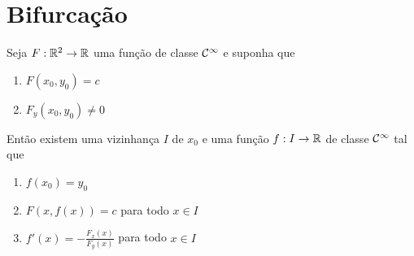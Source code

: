 \section{Bifurcação}

\begin{theorem}
Seja $F: \mathbb{R}^2 \to \mathbb{R}$ uma função de classe $\mathcal{C}^\infty$ e suponha que
\begin{enumerate}
\item $F(x_0, y_0) = c$
\item $F_y(x_0, y_0) \neq 0$
\end{enumerate} 
Então existem uma vizinhança $I$ de $x_0$ e uma função $f: I \to \mathbb{R}$ de classe $\mathcal{C}^\infty$ tal que
\begin{enumerate}
\item $f(x_0) = y_0$
\item $F(x, f(x)) = c$ para todo $x \in I$
\item $f'(x) = -\frac{F_x(x)}{F_y(x)}$ para todo $x \in I$
\end{enumerate}
\end{theorem}